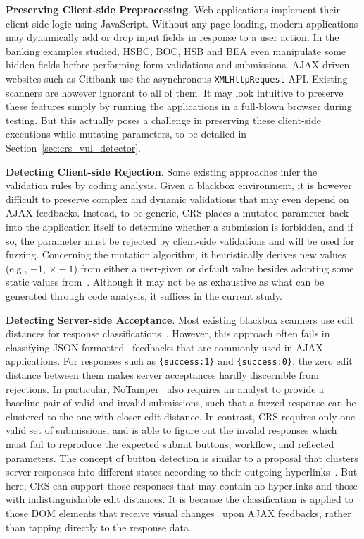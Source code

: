 \documentclass[letter]{sig-alternate-2013}
\begin{document}
\textbf{Preserving Client-side Preprocessing}. Web applications implement their client-side logic using JavaScript. Without any page loading, modern applications may dynamically add or drop input fields in response to a user action. In the banking examples studied, HSBC, BOC, HSB and BEA even manipulate some hidden fields before performing form validations and submissions. AJAX-driven websites such as Citibank use the asynchronous \verb"XMLHttpRequest" API. Existing scanners are however ignorant to all of them. It may look intuitive to preserve these features simply by running the applications in a full-blown browser during testing. But this actually poses a challenge in preserving these client-side executions while mutating parameters, to be detailed in Section~\ref{sec:crs_vul_detector}.

\textbf{Detecting Client-side Rejection}. Some existing approaches infer the validation rules by coding analysis\cite{notamper,waptec}. Given a blackbox environment, it is however difficult to preserve complex and dynamic validations that may even depend on AJAX feedbacks. Instead, to be generic, CRS places a mutated parameter back into the application itself to determine whether a submission is forbidden, and if so, the parameter must be rejected by client-side validations and will be used for fuzzing. Concerning the mutation algorithm, it heuristically derives new values (e.g., $+1$, $\times-1$) from either a user-given or default value besides adopting some static values from~\cite{tamperdata}. Although it may not be as exhaustive as what can be generated through code analysis, it suffices in the current study.

\textbf{Detecting Server-side Acceptance}. Most existing blackbox scanners use edit distances for response classifications~\cite{notamper,webscarab,acunetix}. However, this approach often fails in classifying JSON-formatted~\cite{json} feedbacks that are commonly used in AJAX applications. For responses such as \verb"{success:1}" and \verb"{success:0}", the zero edit distance between them makes server acceptances hardly discernible from rejections. In particular, NoTamper~\cite{notamper} also requires an analyst to provide a baseline pair of valid and invalid submissions, such that a fuzzed response can be clustered to the one with closer edit distance. In contrast, CRS requires only one valid set of submissions, and is able to figure out the invalid responses which must fail to reproduce the expected submit buttons, workflow, and reflected parameters. The concept of button detection is similar to a proposal that clusters server responses into different states according to their outgoing hyperlinks~\cite{state-aware}. But here, CRS can support those responses that may contain no hyperlinks and those with indistinguishable edit distances. It is because the classification is applied to those DOM elements that receive visual changes~\cite{mutationobserver} upon AJAX feedbacks, rather than tapping directly to the response data.
\end{document}
